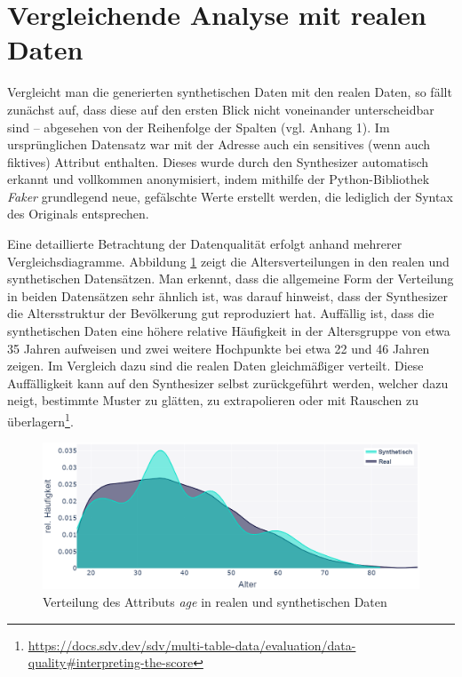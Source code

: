 \section{Vergleichende Analyse mit realen Daten}
\label{sec:comparing-analysis}
\begin{spacing}{1.5}

Vergleicht man die generierten synthetischen Daten mit den realen Daten, so fällt zunächst auf, dass diese auf den ersten Blick nicht voneinander unterscheidbar sind -- abgesehen von der Reihenfolge der Spalten (vgl. Anhang 1). Im ursprünglichen Datensatz war mit der Adresse auch ein sensitives (wenn auch fiktives) Attribut enthalten. Dieses wurde durch den Synthesizer automatisch erkannt und vollkommen anonymisiert, indem mithilfe der Python-Bibliothek \textit{Faker} grundlegend neue, gefälschte Werte erstellt werden, die lediglich der Syntax des Originals entsprechen.

Eine detaillierte Betrachtung der Datenqualität erfolgt anhand mehrerer Vergleichsdiagramme. Abbildung \ref{fig:real-vs-synthetic-age} zeigt die Altersverteilungen in den realen und synthetischen Datensätzen. Man erkennt, dass die allgemeine Form der Verteilung in beiden Datensätzen sehr ähnlich ist, was darauf hinweist, dass der Synthesizer die Altersstruktur der Bevölkerung gut reproduziert hat.  Auffällig ist, dass die synthetischen Daten eine höhere relative Häufigkeit in der Altersgruppe von etwa 35 Jahren aufweisen und zwei weitere Hochpunkte bei etwa 22 und 46 Jahren zeigen. Im Vergleich dazu sind die realen Daten gleichmäßiger verteilt. Diese Auffälligkeit kann auf den Synthesizer selbst zurückgeführt werden, welcher dazu neigt, bestimmte Muster zu glätten, zu extrapolieren oder mit Rauschen zu überlagern\footnote{\url{https://docs.sdv.dev/sdv/multi-table-data/evaluation/data-quality\#interpreting-the-score}}.

\begin{figure}[ht]
\begin{center}
\includegraphics[width=\textwidth]{img/real-vs-synthetic-age.png}
\caption[Verteilung des Attributs \textit{age} in realen und synthetischen Daten]{Verteilung des Attributs \textit{age} in realen und synthetischen Daten}
\label{fig:real-vs-synthetic-age}
\end{center}
\end{figure}


\end{spacing}
